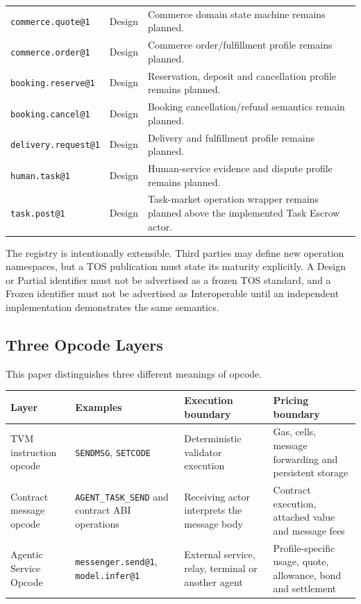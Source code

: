 \documentclass[11pt,oneside]{article}
\newcommand{\opid}[1]{\texttt{#1}}
\begin{document}
\begin{longtable}{L{0.30\textwidth}L{0.16\textwidth}L{0.43\textwidth}}
\opid{commerce.quote@1} & Design & Commerce domain state machine remains planned. \\
\opid{commerce.order@1} & Design & Commerce order/fulfillment profile remains planned. \\
\opid{booking.reserve@1} & Design & Reservation, deposit and cancellation profile remains planned. \\
\opid{booking.cancel@1} & Design & Booking cancellation/refund semantics remain planned. \\
\opid{delivery.request@1} & Design & Delivery and fulfillment profile remains planned. \\
\opid{human.task@1} & Design & Human-service evidence and dispute profile remains planned. \\
\opid{task.post@1} & Design & Task-market operation wrapper remains planned above the implemented Task Escrow actor. \\
\bottomrule
\end{longtable}

The registry is intentionally extensible. Third parties may define new operation namespaces,
but a TOS publication must state its maturity explicitly. A Design or Partial identifier must
not be advertised as a frozen TOS standard, and a Frozen identifier must not be advertised as
Interoperable until an independent implementation demonstrates the same semantics.

\subsection{Three Opcode Layers}

This paper distinguishes three different meanings of opcode.

\begin{longtable}{L{0.22\textwidth}L{0.23\textwidth}L{0.21\textwidth}L{0.23\textwidth}}
\toprule
Layer & Examples & Execution boundary & Pricing boundary \\
\midrule
\endhead
TVM instruction opcode &
\texttt{SENDMSG}, \texttt{SETCODE} &
Deterministic validator execution &
Gas, cells, message forwarding and persistent storage \\
Contract message opcode &
\texttt{AGENT\_TASK\_SEND} and contract ABI operations &
Receiving actor interprets the message body &
Contract execution, attached value and message fees \\
Agentic Service Opcode &
\texttt{messenger.send@1}, \texttt{model.infer@1} &
External service, relay, terminal or another agent &
Profile-specific usage, quote, allowance, bond and settlement \\
\bottomrule
\end{longtable}
\end{document}
